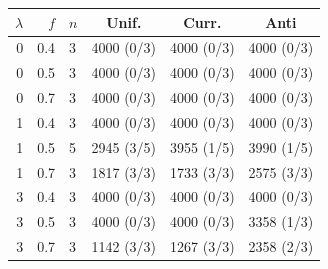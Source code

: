 \begin{tabular}{rrlccc}
\toprule
$\lambda$ & $f$ & $n$ & Unif. & Curr. & Anti \\
\midrule
0 & 0.4 & 3 & 4000 (0/3) & 4000 (0/3) & 4000 (0/3) \\
0 & 0.5 & 3 & 4000 (0/3) & 4000 (0/3) & 4000 (0/3) \\
0 & 0.7 & 3 & 4000 (0/3) & 4000 (0/3) & 4000 (0/3) \\
1 & 0.4 & 3 & 4000 (0/3) & 4000 (0/3) & 4000 (0/3) \\
1 & 0.5 & 5 & 2945 (3/5) & 3955 (1/5) & 3990 (1/5) \\
1 & 0.7 & 3 & 1817 (3/3) & 1733 (3/3) & 2575 (3/3) \\
3 & 0.4 & 3 & 4000 (0/3) & 4000 (0/3) & 4000 (0/3) \\
3 & 0.5 & 3 & 4000 (0/3) & 4000 (0/3) & 3358 (1/3) \\
3 & 0.7 & 3 & 1142 (3/3) & 1267 (3/3) & 2358 (2/3) \\
\bottomrule
\end{tabular}
